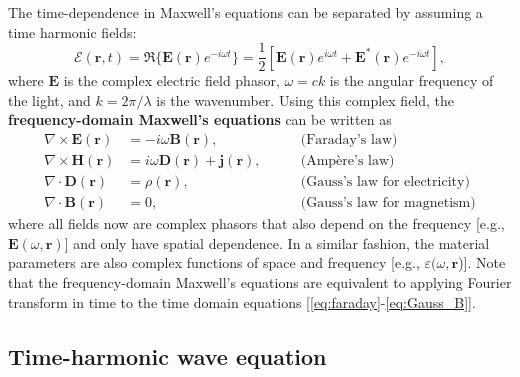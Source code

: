 The time-dependence in Maxwell's equations can be separated by assuming a
time harmonic fields:
\begin{equation}
    \bm{\mathcal{E}}(\mathbf{r}, t) = \Re \{ \mathbf{E}(\mathbf{r}) e^{-i\omega
            t} \}= \frac{1}{2}\left[ \mathbf{E}(\mathbf{r}) e^{i\omega t} +
        \mathbf{E}^*(\mathbf{r}) e^{-i\omega t}\right],
\end{equation}
where $\mathbf{E}$ is the complex electric field phasor, $\omega=ck$ is the angular
frequency of the light, and $k=2\pi/\lambda$ is the wavenumber.
Using this complex field, the \textbf{frequency-domain Maxwell's equations} can be written as
\begin{align}
    \nabla \times \mathbf{E}(\mathbf{r}) & = -i\omega \mathbf{B}(\mathbf{r}),
    \quad \quad                          & \text{(Faraday's law)} \label{eq:curlE_freq}                                   \\
    \nabla \times \mathbf{H}(\mathbf{r}) & = i\omega  \mathbf{D}(\mathbf{r}) +
    \mathbf{j}(\mathbf{r}), \quad \quad  & \text{(Ampère's law)}
    \label{eq:curlH_freq}                                                                                                 \\
    \nabla \cdot \mathbf{D}(\mathbf{r})  & = \rho(\mathbf{r}), \quad \quad
                                         & \text{(Gauss's law for electricity)} \label{eq:divD_freq}                      \\
    \nabla \cdot \mathbf{B}(\mathbf{r})  & = 0, \quad \quad                                          & \text{(Gauss's law
        for magnetism)} \label{eq:divB_freq}
\end{align}
where all fields now are complex phasors that also depend on the frequency
[e.g., $\mathbf{E}(\omega, \mathbf{r})$] and only have spatial dependence. In a
similar fashion,
the material parameters are also complex functions of space and frequency [e.g.,
$\varepsilon(\omega, \mathbf{r}$)].
    Note that the frequency-domain Maxwell's equations are equivalent to applying
    Fourier transform in time to the time domain
    equations [\eqref{eq:faraday}-\eqref{eq:Gauss_B}].

    \subsection*{Time-harmonic wave equation}

